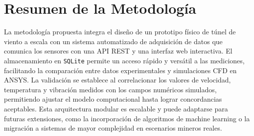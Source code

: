 \section{Resumen de la Metodología}
La metodología propuesta integra el diseño de un prototipo físico de túnel de viento a escala con un sistema automatizado de adquisición de datos que comunica los sensores con una API REST y una interfaz web interactiva. El almacenamiento en \texttt{SQLite} permite un acceso rápido y versátil a las mediciones, facilitando la comparación entre datos experimentales y simulaciones CFD en ANSYS. La validación se establece al correlacionar los valores de velocidad, temperatura y vibración medidos con los campos numéricos simulados, permitiendo ajustar el modelo computacional hasta lograr concordancias aceptables. Esta arquitectura modular es escalable y puede adaptarse para futuras extensiones, como la incorporación de algoritmos de machine learning o la migración a sistemas de mayor complejidad en escenarios mineros reales.
